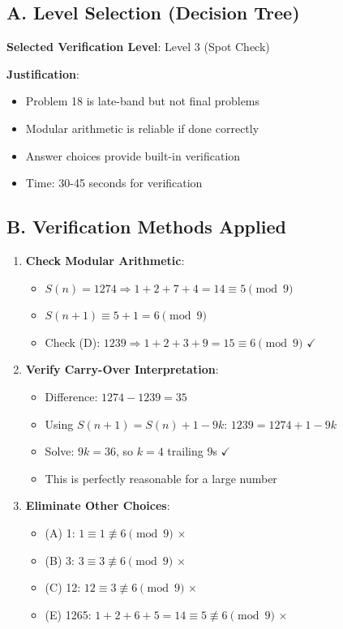 \documentclass[]{article}
\begin{document}
\begin{verificationbox}
\subsection*{A. Level Selection (Decision Tree)}
\textbf{Selected Verification Level}: Level 3 (Spot Check)

\textbf{Justification}:
\begin{itemize}
    \item Problem 18 is late-band but not final problems
    \item Modular arithmetic is reliable if done correctly
    \item Answer choices provide built-in verification
    \item Time: 30-45 seconds for verification
\end{itemize}

\subsection*{B. Verification Methods Applied}
\begin{enumerate}
    \item \textbf{Check Modular Arithmetic}:
    \begin{itemize}
        \item $S(n) = 1274 \Rightarrow 1+2+7+4 = 14 \equiv 5 \pmod{9}$
        \item $S(n+1) \equiv 5+1 = 6 \pmod{9}$
        \item Check (D): $1239 \Rightarrow 1+2+3+9 = 15 \equiv 6 \pmod{9}$ $\checkmark$
    \end{itemize}
    \item \textbf{Verify Carry-Over Interpretation}:
    \begin{itemize}
        \item Difference: $1274 - 1239 = 35$
        \item Using $S(n+1) = S(n) + 1 - 9k$: $1239 = 1274 + 1 - 9k$
        \item Solve: $9k = 36$, so $k = 4$ trailing 9s $\checkmark$
        \item This is perfectly reasonable for a large number
    \end{itemize}
    \item \textbf{Eliminate Other Choices}:
    \begin{itemize}
        \item (A) 1: $1 \equiv 1 \not\equiv 6 \pmod{9}$ $\times$
        \item (B) 3: $3 \equiv 3 \not\equiv 6 \pmod{9}$ $\times$
        \item (C) 12: $12 \equiv 3 \not\equiv 6 \pmod{9}$ $\times$
        \item (E) 1265: $1+2+6+5 = 14 \equiv 5 \not\equiv 6 \pmod{9}$ $\times$
    \end{itemize}
\end{enumerate}


\end{verificationbox}
\end{document}
